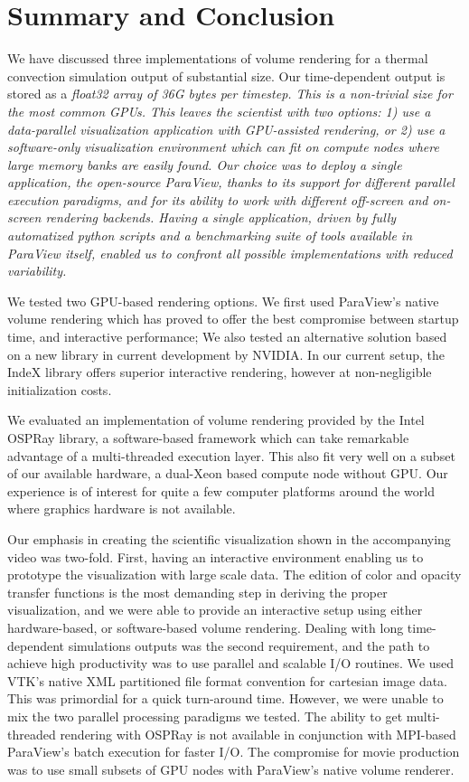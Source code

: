 \documentclass[5p,times]{elsarticle}
\begin{document}
\section{Summary and Conclusion}

We have discussed three implementations of volume rendering for a thermal convection
simulation output of substantial size. Our time-dependent output is stored as a
\it{float32} \rm array of 36G bytes per timestep. This is a non-trivial size for the most common
GPUs. This leaves the scientist with two options: 1) use a data-parallel visualization
application with GPU-assisted rendering, or 2) use a \it{software-only} \rm
visualization environment which can fit on compute nodes where large memory
banks are easily found. Our choice was to deploy a single application, the open-source
ParaView, thanks to its support for different parallel execution paradigms, and for its ability to work with different off-screen and on-screen rendering backends. Having a single application,
driven by fully automatized python scripts and a benchmarking suite of tools
available in ParaView itself, enabled us to confront all possible implementations with reduced variability.

We tested two GPU-based rendering options. We first used ParaView's native volume rendering which has proved to offer the best compromise between startup time, and interactive performance; We also tested an alternative solution based on a new library in current development by NVIDIA. In our current setup, the IndeX library offers superior interactive rendering, however at non-negligible initialization costs.

We evaluated an implementation of volume rendering provided by the Intel OSPRay library,
a software-based framework which can take remarkable advantage of a multi-threaded
execution layer. This also fit very well on a subset of our available hardware, a dual-Xeon based compute node without GPU. Our experience is of interest for quite a few computer platforms around the world where graphics hardware is not available. 

Our emphasis in creating the scientific visualization shown in the accompanying video \cite{fav18} was two-fold. 
First, having an interactive environment enabling us to prototype the visualization with large scale data. The edition of color and opacity transfer functions is the most demanding step in
deriving the proper visualization, and we were able to provide an interactive setup using either hardware-based, or software-based volume rendering. Dealing with long time-dependent simulations outputs was the second requirement, and the path to achieve high productivity was to use parallel and scalable I/O routines. We used VTK's native XML partitioned file format convention for cartesian image data. This was primordial for a quick turn-around time. However, we were unable to mix the two parallel processing paradigms we tested. The ability to get multi-threaded rendering with OSPRay is not available in conjunction with MPI-based ParaView's batch execution for faster I/O. The compromise for movie production was to use small subsets of GPU nodes with ParaView's native volume renderer.
\end{document}
